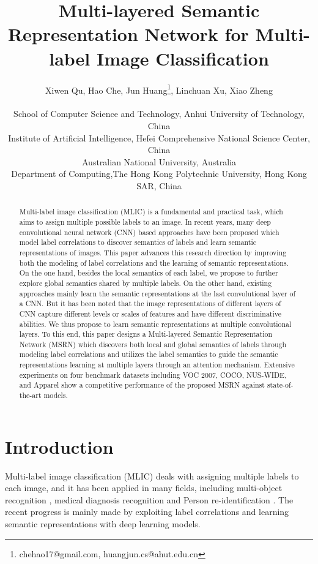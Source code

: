 \documentclass{article} \usepackage{nips14submit_e,times}
\title{Multi-layered Semantic Representation Network for Multi-label Image Classification}
\author{
Xiwen Qu, Hao Che, Jun Huang\thanks{chehao17@gmail.com, huangjun.cs@ahut.edu.cn}, Linchuan Xu, Xiao Zheng \\\\
School of Computer Science and Technology, Anhui University of Technology, China\\
Institute of Artificial Intelligence, Hefei Comprehensive National Science Center, China\\
Australian National University, Australia\\
Department of Computing,The Hong Kong Polytechnic University, Hong Kong SAR, China\\
}
\begin{document}
\maketitle

\begin{abstract}
Multi-label image classification (MLIC) is a fundamental and practical task, which aims to assign multiple possible labels to an image.
In recent years, many deep convolutional neural network (CNN) based approaches have been proposed which model label correlations to discover semantics of labels and learn semantic representations of images. This paper advances this research direction by improving both the modeling of label correlations and the learning of semantic representations. On the one hand, besides the local semantics of each label, we propose to further explore global semantics shared by multiple labels.
On the other hand, existing approaches mainly learn the semantic representations at the last convolutional layer of a CNN.
But it has been noted that the image representations of different layers of CNN capture different levels or scales of features and have different discriminative abilities. We thus propose to learn semantic representations at multiple convolutional layers. To this end, this paper designs a Multi-layered Semantic Representation Network (MSRN) which discovers both local and global semantics of labels through modeling label correlations and utilizes the label semantics to guide the semantic representations learning at multiple layers through an attention mechanism.
Extensive experiments on four benchmark datasets including VOC 2007, COCO, NUS-WIDE, and Apparel show a competitive performance of the proposed MSRN against state-of-the-art models.

\end{abstract}


\section{Introduction}
\label{sec:intro}
Multi-label image classification (MLIC) deals with assigning multiple labels to each image,
and it has been applied in many fields, including multi-object
recognition \cite{CVPR2016:ODVT}, medical diagnosis recognition \cite{Chest-X-rays} and Person re-identification \cite{CVPR2020:PRID}. The recent progress is mainly made by exploiting label correlations and learning semantic representations with deep learning models.
\end{document}

